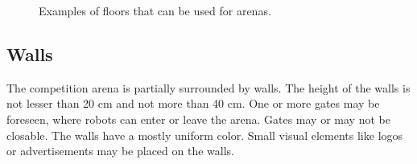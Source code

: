 \begin{figure} [h!]
\begin{center}
 \hspace{0.1cm}
 \hspace{0.1cm}
 \hspace{0.1cm}
 \hspace{0.1cm}
\end{center}
\caption{Examples of floors that can be used for \RCAW arenas.}
\label{fig:example_floors}
\end{figure}

\subsection{Walls}
The competition arena is partially surrounded by walls.  The height of the walls is not lesser than 20 cm and not more than 40 cm. One or more gates may be foreseen, where robots can enter or leave the arena. Gates may or may not be closable. The walls have a mostly uniform color. Small visual elements like logos or advertisements may be placed on the walls.


